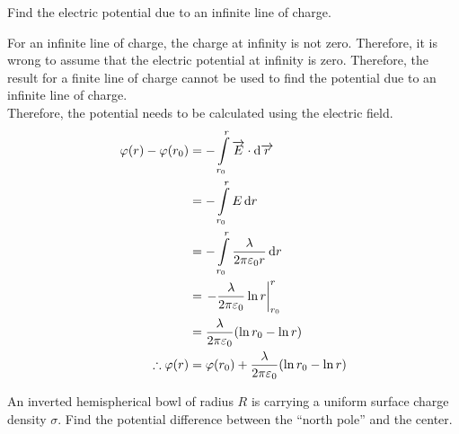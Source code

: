 \documentclass[fleqn, a4paper, 8pt, twoside]{amsart}
\theoremstyle{definition}
\theoremstyle{theorem}
\begin{document}
\begin{multicols}{2}
\begin{spacing}{0.6}
\begin{question}
	Find the electric potential due to an infinite line of charge.
\end{question}

\begin{solution}
	For an infinite line of charge, the charge at infinity is not zero.
	Therefore, it is wrong to assume that the electric potential at infinity is zero.
	Therefore, the result for a finite line of charge cannot be used to find the potential due to an infinite line of charge.\\
	Therefore, the potential needs to be calculated using the electric field.
	\begin{align*}
		\varphi(r) - \varphi(r_0) &= -\int\limits_{r_0}^{r} \overrightarrow{E} \cdot \dif \overrightarrow{r}\\
		&= - \int\limits_{r_0}^{r} E \dif r\\
		&= - \int\limits_{r_0}^{r} \frac{\lambda}{2 \pi \varepsilon_0 r} \dif r\\
		&= \left. - \frac{\lambda}{2 \pi \varepsilon_0} \ln r \right|_{r_0}^{r}\\
		&= \frac{\lambda}{2 \pi \varepsilon_0} (\ln r_0 - \ln r)\\
		\therefore \varphi(r) &= \varphi(r_0) + \frac{\lambda}{2 \pi \varepsilon_0} (\ln r_0 - \ln r)
	\end{align*}
\end{solution}

\begin{question}
	An inverted hemispherical bowl of radius $R$ is carrying a uniform surface charge density $\sigma$.
	Find the potential difference between the ``north pole'' and the center.
\end{question}


\end{spacing}
\end{multicols}
\end{document}

